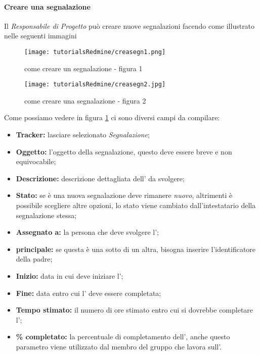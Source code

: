 \documentclass{scalatekids-article}
\begin{document}
\paragraph{Creare una segnalazione}
Il \textit{Responsabile di Progetto} può creare nuove segnalazioni facendo come illustrato nelle seguenti immagini
\begin{figure}[H]
  \centering
  \texttt{[image: tutorialsRedmine/creasegn1.png]}
  \caption{come creare un segnalazione - figura 1}
\end{figure}
\begin{figure}[H]
  \centering
  \texttt{[image: tutorialsRedmine/creasegn2.jpg]}
  \caption{come creare una segnalazione - figura 2\label{fig:crea-segnalazione-2}}
\end{figure}
Come possiamo vedere in figura \ref{fig:crea-segnalazione-2} ci sono diversi campi da compilare:
\begin{itemize}
\item \textbf{Tracker:} lasciare selezionato \textit{Segnalazione};
\item \textbf{Oggetto:} l'oggetto della segnalazione, questo deve essere breve e non equivocabile;
\item \textbf{Descrizione:} descrizione dettagliata dell' da svolgere;
\item \textbf{Stato:} se è una nuova segnalazione deve rimanere \textit{nuovo}, altrimenti è possibile scegliere altre opzioni, lo stato viene cambiato dall'intestatario della segnalazione stessa;
\item \textbf{Assegnato a:} la persona che deve svolgere l';
\item \textbf{ principale:} se questa è una sotto  di un altra, bisogna inserire l'identificatore della  padre;
\item \textbf{Inizio:} data in cui deve iniziare l';
\item \textbf{Fine:} data entro cui l' deve essere completata;
\item \textbf{Tempo stimato:} il numero di ore stimato entro cui si dovrebbe completare l';
\item \textbf{\% completato:} la percentuale di completamento dell', anche questo parametro viene utilizzato dal membro del gruppo che lavora sull'.
\end{itemize}
\end{document}
